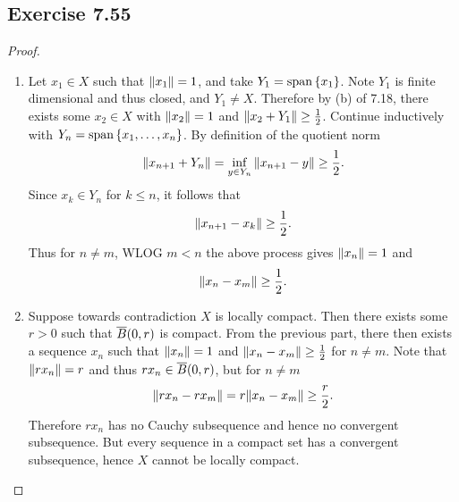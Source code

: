 \documentclass[hw_all.tex]{subfiles}
\begin{document}
\subsection{Exercise 7.55}
\begin{proof}
    \begin{enumerate}
        \item 
            Let $x_1 \in X$ such that $\norm{x_1} = 1$, and take $Y_1 = \operatorname{span}\qty{x_1}$. Note $Y_1$ is finite dimensional and thus closed, and $Y_1 \neq X$. Therefore by (b) of 7.18, there exists some $x_2 \in X$ with $\norm{x_2} = 1$ and $\norm{x_2 + Y_1} \geq \frac{1}{2}$. Continue inductively with $Y_n = \operatorname{span}\qty{x_1, \ldots, x_n}$. By definition of the quotient norm
            \[
                \norm{x_{n+1} + Y_n} = \inf_{y \in Y_n} \norm{x_{n+1} - y} \geq \frac{1}{2}
            .\]
            Since $x_k \in Y_n$ for $k \leq n$, it follows that
            \[
                \norm{x_{n+1} - x_k} \geq \frac{1}{2}
            .\]
            Thus for $n \neq m$, WLOG $m < n$ the above process gives $\norm{x_n} = 1$ and
            \[
                \norm{x_n - x_m} \geq \frac{1}{2}
            .\]

        \item 
            Suppose towards contradiction $X$ is locally compact. Then there exists some $r > 0$ such that $\overline{B}(0,r)$ is compact. From the previous part, there then exists a sequence $x_n$ such that $\norm{x_n} = 1$ and $\norm{x_n - x_m} \geq \frac{1}{2}$ for $n \neq m$. Note that $\norm{rx_n} = r$ and thus $rx_n \in \overline{B}(0,r)$, but for $n\neq m$
            \[
                \norm{rx_n - rx_m} = r \norm{x_n - x_m} \geq \frac{r}{2}
            .\]
            Therefore $rx_n$ has no Cauchy subsequence and hence no convergent subsequence. But every sequence in a compact set has a convergent subsequence, hence $X$ cannot be locally compact.
    \end{enumerate}
\end{proof}
\end{document}
